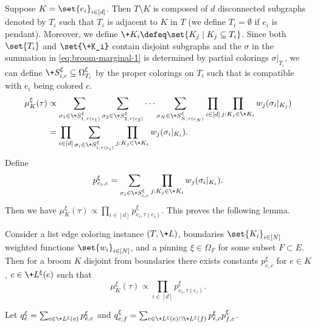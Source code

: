 Suppose $K = \set{e_i}_{i\in [d]}$.
Then $T\setminus K$ is composed of $d$ disconnected subgraphs denoted by $T_i$
such that $T_i$ is adjacent to $K$ in $T$ (we define $T_i = \emptyset$
if $e_i$ is pendant).
Moreover, we define $\+K_i\defeq\set{K_j\mid K_j\subseteq T_i}$.
Since both $\set{T_i}$ and $\set{\+K_i}$ contain disjoint subgraphs and 
the $\sigma$ in the summation in \cref{eq:broom-marginal-1}
is determined by partial colorings $\sigma|_{T_i}$,
we can define $\+S^\xi_{i, c}\subseteq \Omega^\xi_{T_i}$ by the proper colorings 
on $T_i$ such that is compatible with $e_i$ being colored $c$.
\begin{align*}
\mu^\xi_K(\tau)
&\propto
  \sum_{\sigma_1\in \+S^\xi_{1, \tau(e_1)}}
  \sum_{\sigma_2\in \+S^\xi_{2, \tau(e_2)}}\dots
  \sum_{\sigma_N\in \+S^\xi_{N, \tau(e_N)}}
  \prod_{i\in [d]} \prod_{j : K_j\in \+K_i} w_j(\sigma_i|_{K_j})\\
&= \prod_{i\in [d]} \sum_{\sigma_i\in \+S^\xi_{i, \tau(e_i)}}
     \prod_{j : K_j\in \+K_i} w_j(\sigma_i|_{K_i}).
\end{align*}
Define 
\[
p^\xi_{e_i,c}=\sum_{\sigma_i\in \+S^\xi_{i, c}}
     \prod_{j : K_j\in \+K_i} w_j(\sigma_i|_{K_i}).
\]
Then we have $\mu^\xi_K(\tau)\propto\prod_{i\in [d]} p^\xi_{e_i,\tau(e_i)}$.
This proves the following lemma.
\begin{lemma}
    Consider a list edge coloring instance $(T, \+L)$,
    boundaries $\set{K_i}_{i\in [N]}$
    weighted functions $\set{w_i}_{i\in [N]}$,
    and a pinning $\xi\in \Omega_{F}$ for some subset $F\subset E$.
    Then for a broom $K$ disjoint from boundaries
    there exists constants $p^\xi_{e, c}$ for $e\in K$, $c\in \+L^\xi(e)$ such that
    \[
    \mu^\xi_K(\tau)\propto\prod_{i\in [d]} p^\xi_{e_i,\tau(e_i)}.
    \]
\end{lemma}

Let $q^\xi_e=\sum_{c\in \+L^\xi(e)} p^\xi_{e,c}$
and $q^\xi_{e,f}=\sum_{c\in \+L^\xi(e)\cap \+L^\xi(f)} p^\xi_{e,c}p^\xi_{f,c}$.


